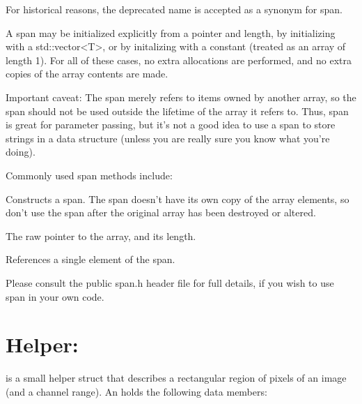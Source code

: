 For historical reasons, the deprecated name \arrayview is accepted as a
synonym for {\cf span}.

A {\cf span} may be initialized explicitly from a pointer and length, by
initializing with a {\cf std::vector<T>}, or by initalizing with a constant
(treated as an array of length 1). For all of these cases, no extra
allocations are performed, and no extra copies of the array contents are
made.

Important caveat: The {\cf span} merely refers to items owned by another
array, so the {\cf span} should not be used outside the lifetime of the
array it refers to. Thus, {\cf span} is great for parameter passing, but
it's not a good idea to use a {\cf span} to store strings in a data
structure (unless you are really sure you know what you're doing).

\noindent Commonly used {\cf span} methods include:

Constructs a {\cf span}.  The {\cf span} doesn't have its own copy of the
array elements, so don't use the {\cf span} after the original array has been
destroyed or altered.
\apiend

The raw pointer to the array, and its length.
\apiend

References a single element of the {\cf span}.
\apiend

\smallskip
\noindent Please consult the public {\cf span.h}
header file for full details, if you wish to use {\cf span} in your own
code.


\section{Helper: \ROI}
\label{sec:ROI}

\ROI is a small helper struct that describes a rectangular region of
pixels of an image (and a channel range).  An \ROI holds the following
data members:

